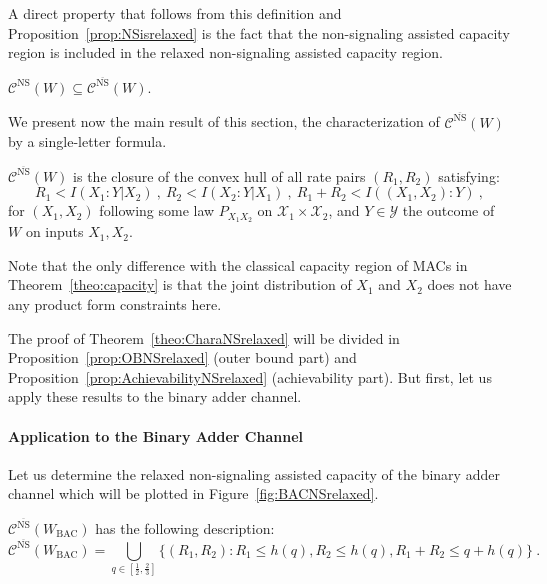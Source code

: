   A direct property that follows from this definition and Proposition~\ref{prop:NSisrelaxed} is the fact that the non-signaling assisted capacity region is included in the relaxed non-signaling assisted capacity region.
  \begin{corollary}
    \label{cor:NSisrelaxed}
      $\mathcal{C}^{\mathrm{NS}}(W) \subseteq \mathcal{C}^{\overline{\mathrm{NS}}}(W)$.
  \end{corollary}

  We present now the main result of this section, the characterization of $\mathcal{C}^{\overline{\mathrm{NS}}}(W)$ by a single-letter formula.
  
  \begin{theorem}
        \label{theo:CharaNSrelaxed}
        $\mathcal{C}^{\overline{\mathrm{NS}}}(W)$ is the closure of the convex hull of all rate pairs $(R_1,R_2)$ satisfying:
        \[ R_1 < I(X_1:Y|X_2)\ ,\ R_2 < I(X_2:Y|X_1)\ ,\ R_1+R_2 < I((X_1,X_2):Y) \ ,\]
        for $(X_1,X_2)$ following some law $P_{X_1X_2}$ on $\mathcal{X}_1 \times \mathcal{X}_2$, and $Y \in \mathcal{Y}$ the outcome of $W$ on inputs $X_1,X_2$.
  \end{theorem}

  \begin{rk}
    Note that the only difference with the classical capacity region of MACs in Theorem~\ref{theo:capacity} is that the joint distribution of $X_1$ and $X_2$ does not have any product form constraints here.
  \end{rk}

  The proof of Theorem~\ref{theo:CharaNSrelaxed} will be divided in Proposition~\ref{prop:OBNSrelaxed} (outer bound part) and Proposition~\ref{prop:AchievabilityNSrelaxed} (achievability part). But first, let us apply these results to the binary adder channel.
  
  \paragraph{Application to the Binary Adder Channel} 
  Let us determine the relaxed non-signaling assisted capacity of the binary adder channel which will be plotted in Figure~\ref{fig:BACNSrelaxed}.
  
  \begin{proposition}
    \label{prop:BACcapacityNSrelaxed}
     $\mathcal{C}^{\overline{\mathrm{NS}}}(W_{\text{BAC}})$ has the following description:
   \[ \mathcal{C}^{\overline{\mathrm{NS}}}(W_{\text{BAC}}) =  \bigcup_{q \in \left[\frac{1}{2},\frac{2}{3}\right]} \{ (R_1,R_2) : R_1 \leq h\left(q\right), R_2 \leq h\left(q\right), R_1+R_2 \leq q+h\left(q\right)\} \ . \]
  \end{proposition}

